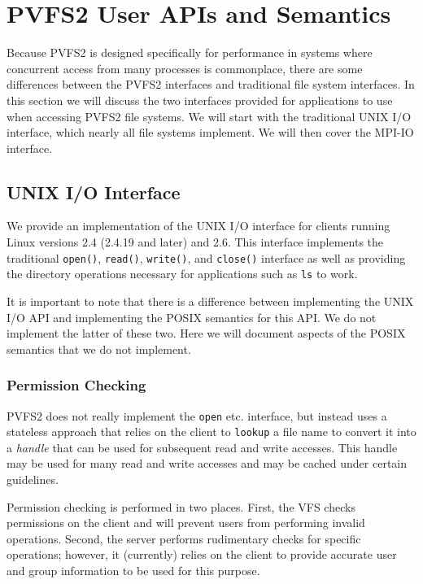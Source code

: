 \section{PVFS2 User APIs and Semantics}
\label{sec:apis}

Because PVFS2 is designed specifically for performance in systems where
concurrent access from many processes is commonplace, there are some
differences between the PVFS2 interfaces and traditional file system
interfaces.
%
In this section we will discuss the two interfaces provided for applications
to use when accessing PVFS2 file systems.  We will start with the traditional
UNIX I/O interface, which nearly all file systems implement.  We will then
cover the MPI-IO interface.

\subsection{UNIX I/O Interface}

We provide an implementation of the UNIX I/O interface for clients running
Linux versions 2.4 (2.4.19 and later) and 2.6.  This interface implements the
traditional \texttt{open()}, \texttt{read()}, \texttt{write()}, and
\texttt{close()} interface as well as providing the directory operations
necessary for applications such as \texttt{ls} to work.

It is important to note that there is a difference between implementing the
UNIX I/O API and implementing the POSIX semantics for this API.  We do not
implement the latter of these two.  Here we will document aspects of the POSIX
semantics that we do not implement.

\subsubsection{Permission Checking}

PVFS2 does not really implement the \texttt{open} etc. interface, but instead
uses a stateless approach that relies on the client to \texttt{lookup} a file
name to convert it into a \emph{handle} that can be used for subsequent read
and write accesses.  This handle may be used for many read and write accesses
and may be cached under certain guidelines.

Permission checking is performed in two places.  First, the VFS checks
permissions on the client and will prevent users from performing invalid
operations.  Second, the server performs rudimentary checks for specific
operations; however, it (currently) relies on the client to provide accurate
user and group information to be used for this purpose.

